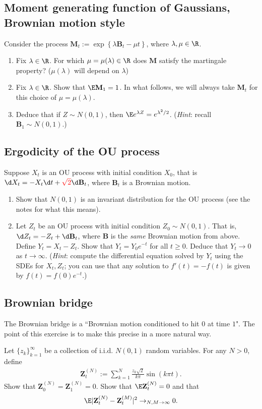 \documentclass[12pt,reqno]{amsart}
\theoremstyle{definition}
\theoremstyle{remark}
\numberwithin{equation}{section}
\begin{document}
\subsection{Moment generating function of Gaussians, Brownian motion style}
Consider the process $\mathbf{M}_{t}:=\exp\left\{\lambda\mathbf{B}_{t}-\mu t\right\}$, where $\lambda,\mu\in\R$.
\begin{enumerate}
\item Fix $\lambda\in\R$. For which $\mu=\mu(\lambda)\in\R$ does $\mathbf{M}$ satisfy the martingale property? ($\mu(\lambda)$ will depend on $\lambda$)
\item Fix $\lambda\in\R$. Show that $\E\mathbf{M}_{1}=1$. In what follows, we will always take $\mathbf{M}_{t}$ for this choice of $\mu=\mu(\lambda)$.
\item Deduce that if $Z\sim N(0,1)$, then $\E e^{\lambda Z}=e^{\lambda^{2}/2}$. (\emph{Hint}: recall $\mathbf{B}_{1}\sim N(0,1)$.)
\end{enumerate}
\subsection{Ergodicity of the OU process}
Suppose $X_{t}$ is an OU process with initial condition $X_{0}$, that is $\d X_{t}=- X_{t}\d t+{\color{red}\sqrt{2}}\d\mathbf{B}_{t}$, where $\mathbf{B}_{t}$ is a Brownian motion.
\begin{enumerate}
\item Show that $N(0,1)$ is an invariant distribution for the OU process (see the notes for what this means).
\item Let $Z_{t}$ be an OU process with initial condition $Z_{0}\sim N(0,1)$. That is, $\d Z_{t}=- Z_{t}+\d\mathbf{B}_{t}$, where $\mathbf{B}$ is the \emph{same} Brownian motion from above. Define $Y_{t}=X_{t}-Z_{t}$. Show that $Y_{t}=Y_{0}e^{-t}$ for all $t\geq0$. Deduce that $Y_{t}\to0$ as $t\to\infty$. (\emph{Hint}: compute the differential equation solved by $Y_{t}$ using the SDEs for $X_{t},Z_{t}$; you can use that any solution to $f'(t)=-f(t)$ is given by $f(t)=f(0)e^{-t}$.)
\end{enumerate}
\subsection{Brownian bridge}
The Brownian bridge is a ``Brownian motion conditioned to hit $0$ at time $1$". The point of this exercise is to make this precise in a more natural way. 

Let $\{z_{k}\}_{k=1}^{\infty}$ be a collection of i.i.d. $N(0,1)$ random variables. For any $N>0$, define 
%
\begin{align*}
\mathbf{Z}^{(N)}_{t}:=\sum_{k=1}^{N}\frac{z_{k}\sqrt{2}}{k\pi}\sin(k\pi t).
\end{align*}
%
Show that $\mathbf{Z}^{(N)}_{0}=\mathbf{Z}^{(N)}_{1}=0$. Show that $\E\mathbf{Z}^{(N)}_{t}=0$ and that
%
\begin{align*}
\E|\mathbf{Z}^{(N)}_{t}-\mathbf{Z}^{(M)}_{t}|^{2}\to_{N,M\to\infty}0.
\end{align*}
%
\end{document}
